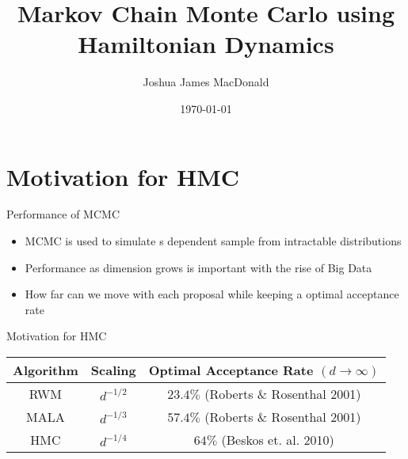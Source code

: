 \documentclass{beamer}
\title[MCMC using Hamiltonian Dynamics]{Markov Chain Monte Carlo using Hamiltonian Dynamics}
\author{Joshua James MacDonald}
\institute{}
\date{\today}
\begin{document}

\begin{frame}
  \titlepage
\end{frame}



\section{Motivation for HMC}


\begin{frame}{Performance of MCMC}

\begin{itemize}
\item MCMC is used to simulate s dependent sample from intractable distributions

\item Performance as dimension grows is important with the rise of Big Data

\item How far can we move with each proposal while keeping a optimal acceptance rate

\end{itemize}

\end{frame}


\begin{frame}{Motivation for HMC}

\begin{table}
\centering
\begin{tabular}{|c||c|c|}
\hline
Algorithm & Scaling & Optimal Acceptance Rate $(d \to \infty)$ \\
\hline
RWM & $d^{-1/2}$ & $23.4\%$ (Roberts \& Rosenthal 2001) \\
MALA & $d^{-1/3}$ & $57.4\%$ (Roberts \& Rosenthal 2001) \\
HMC & $d^{-1/4}$ & $64\%$ (Beskos et. al. 2010) \\
\hline
\end{tabular}
\end{table}

\end{frame}
\end{document}
